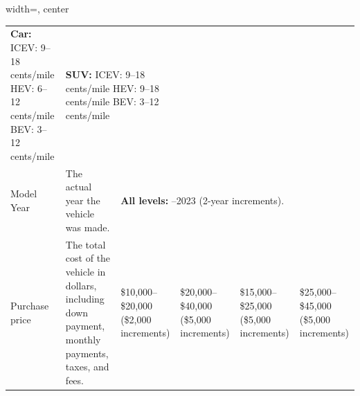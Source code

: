 \begin{table}[pos=H]
\begin{adjustbox}{width=\textwidth, center}
{\begin{tabular}{p{3.2cm} p{4.8cm} p{3cm} p{3cm} p{3cm} p{3cm}}
{  \textbf{Car:} \newline
  ICEV: 9--18 cents/mile\newline
  HEV: 6--12 cents/mile\newline
  BEV: 3--12 cents/mile} & \multicolumn{2}{p{6cm}}{%
  \textbf{SUV:} \newline
  ICEV: 9--18 cents/mile\newline
  HEV: 9--18 cents/mile\newline
  BEV: 3--12 cents/mile} \\
\addlinespace[4pt]
Model Year & The actual year the vehicle was made. & \multicolumn{4}{p{12.5cm}}{\textbf{All levels:} \newline 2015--2023 (2-year increments).} \\
\addlinespace[4pt]
Purchase price & The total cost of the vehicle in dollars, including down payment, monthly payments, taxes, and fees. & \$10,000--\$20,000 \newline (\$2,000 increments) & \$20,000--\$40,000 \newline (\$5,000 increments) & \$15,000--\$25,000 \newline (\$5,000 increments) & \$25,000--\$45,000 \newline (\$5,000 increments) \\
\bottomrule
\end{tabular}}
\end{adjustbox}
\end{table}

